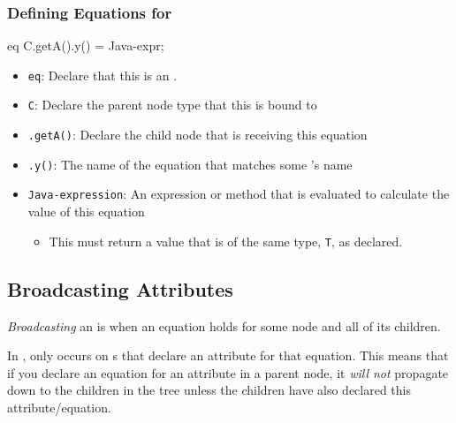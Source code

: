 \subsubsection{Defining Equations for }\label{subsubsec:Define_Inherited_Equations}
\begin{javasource}
eq C.getA().y() = Java-expr;
\end{javasource}
  \begin{itemize}[noitemsep]
  \item \texttt{eq}: Declare that this  is an .
  \item \texttt{C}: Declare the parent  node type that this  is bound to
  \item \texttt{.getA()}: Declare the child  node that is receiving this equation
  \item \texttt{.y()}: The name of the equation that matches some 's name
  \item \texttt{Java-expression}: An expression or method that is evaluated to calculate the value of this equation
    \begin{itemize}[noitemsep]
    \item This must return a value that is of the same type, \texttt{T}, as declared.
    \end{itemize}
  \end{itemize}

\subsection{Broadcasting Attributes}\label{subsec:Broadcasting_Attributes}
\begin{definition}[Broadcasting]\label{def:Broadcasting}
  \emph{Broadcasting} an  is when an equation holds for some node and all of its children.

  \begin{remark}
    In \JastAdd{},  only occurs on s that declare an attribute for that equation.
    This means that if you declare an equation for an attribute in a parent node, it \emph{will not} propagate down to the children in the tree unless the children have also declared this attribute/equation.
  \end{remark}
\end{definition}

